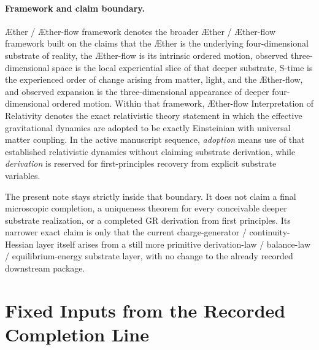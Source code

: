 \documentclass[11pt]{article}
\newcommand{\Aether}{\AE{}ther}
\newcommand{\Aflow}{\AE{}ther-flow}
\newcommand{\TheoryName}{\Aflow{} Interpretation of Relativity}
\newcommand{\TheoryProgram}{\Aether{} / \Aflow{} framework}
\begin{document}
\paragraph{Framework and claim boundary.}
\TheoryProgram{} denotes the broader \Aether{} / \Aflow{} framework built on the claims that the \Aether{} is the underlying four-dimensional substrate of reality, the \Aflow{} is its intrinsic ordered motion, observed three-dimensional space is the local experiential slice of that deeper substrate, S-time is the experienced order of change arising from matter, light, and the \Aflow{}, and observed expansion is the three-dimensional appearance of deeper four-dimensional ordered motion. Within that framework, \TheoryName{} denotes the exact relativistic theory statement in which the effective gravitational dynamics are adopted to be exactly Einsteinian with universal matter coupling. In the active manuscript sequence, \emph{adoption} means use of that established relativistic dynamics without claiming substrate derivation, while \emph{derivation} is reserved for first-principles recovery from explicit substrate variables.

The present note stays strictly inside that boundary. It does not claim a final microscopic completion, a uniqueness theorem for every conceivable deeper substrate realization, or a completed GR derivation from first principles. Its narrower exact claim is only that the current charge-generator / continuity-Hessian layer itself arises from a still more primitive derivation-law / balance-law / equilibrium-energy substrate layer, with no change to the already recorded downstream package.

\section{Fixed Inputs from the Recorded Completion Line}
\end{document}
